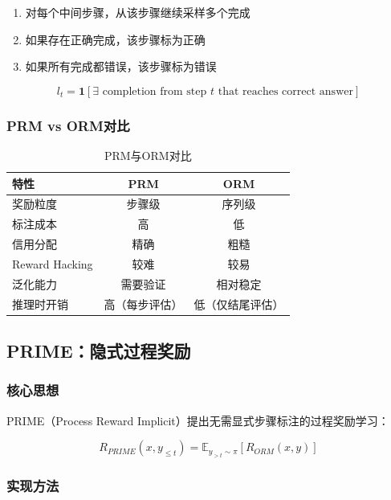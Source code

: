 \documentclass[12pt,a4paper]{article}
\begin{document}
\begin{enumerate}
    \item 对每个中间步骤，从该步骤继续采样多个完成
    \item 如果存在正确完成，该步骤标为正确
    \item 如果所有完成都错误，该步骤标为错误
\end{enumerate}

\begin{equation}
l_t = \mathbf{1}\left[\exists \text{ completion from step } t \text{ that reaches correct answer}\right]
\end{equation}

\subsubsection{PRM vs ORM对比}

\begin{table}[H]
\centering
\caption{PRM与ORM对比}
\begin{tabular}{lcc}
\toprule
\textbf{特性} & \textbf{PRM} & \textbf{ORM} \\
\midrule
奖励粒度 & 步骤级 & 序列级 \\
标注成本 & 高 & 低 \\
信用分配 & 精确 & 粗糙 \\
Reward Hacking & 较难 & 较易 \\
泛化能力 & 需要验证 & 相对稳定 \\
推理时开销 & 高（每步评估） & 低（仅结尾评估） \\
\bottomrule
\end{tabular}
\end{table}

\subsection{PRIME：隐式过程奖励}

\subsubsection{核心思想}

PRIME（Process Reward Implicit）提出无需显式步骤标注的过程奖励学习：

\begin{equation}
R_{PRIME}(x, y_{\leq t}) = \mathbb{E}_{y_{>t} \sim \pi}[R_{ORM}(x, y)]
\end{equation}

\subsubsection{实现方法}
\end{document}
